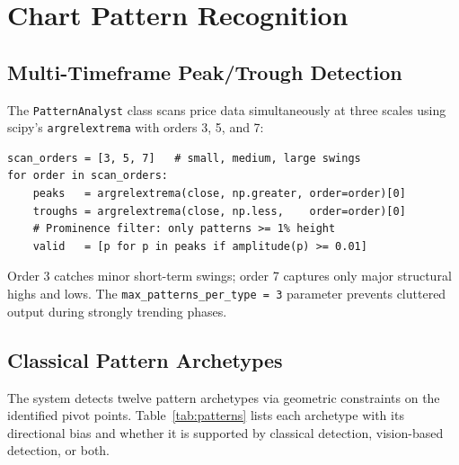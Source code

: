 \documentclass[10pt,a4paper,twoside]{article}
\begin{document}
\section{Chart Pattern Recognition}
\label{sec:patterns}

\subsection{Multi-Timeframe Peak/Trough Detection}

The \texttt{PatternAnalyst} class scans price data simultaneously at three
scales using scipy's \texttt{argrelextrema} with orders 3, 5, and 7:

\begin{lstlisting}[caption={Multi-timeframe peak detection (simplified).}]
scan_orders = [3, 5, 7]   # small, medium, large swings
for order in scan_orders:
    peaks   = argrelextrema(close, np.greater, order=order)[0]
    troughs = argrelextrema(close, np.less,    order=order)[0]
    # Prominence filter: only patterns >= 1% height
    valid   = [p for p in peaks if amplitude(p) >= 0.01]
\end{lstlisting}

Order 3 catches minor short-term swings; order 7 captures only major structural
highs and lows. The \texttt{max\_patterns\_per\_type = 3} parameter prevents
cluttered output during strongly trending phases.

\subsection{Classical Pattern Archetypes}

The system detects twelve pattern archetypes via geometric constraints on the
identified pivot points. Table~\ref{tab:patterns} lists each archetype with
its directional bias and whether it is supported by classical detection,
vision-based detection, or both.
\end{document}
